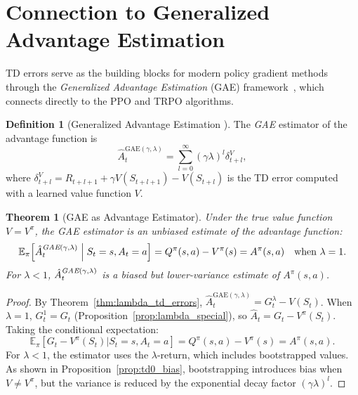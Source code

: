\documentclass[11pt,a4paper]{article}
\theoremstyle{definition}
\newtheorem{definition}{Definition}[section]
\theoremstyle{plain}
\newtheorem{theorem}{Theorem}[section]
\theoremstyle{remark}
\newcommand{\E}{\mathbb{E}}
\begin{document}
\section{Connection to Generalized Advantage Estimation}
\label{sec:gae}

TD errors serve as the building blocks for modern policy gradient methods through the \emph{Generalized Advantage Estimation} (GAE) framework~\cite{schulman2016}, which connects directly to the PPO and TRPO algorithms.

\begin{definition}[Generalized Advantage Estimation {\cite{schulman2016}}]
\label{def:gae}
The \emph{GAE} estimator of the advantage function is
\begin{equation}
    \hat{A}_t^{\text{GAE}(\gamma,\lambda)} = \sum_{l=0}^{\infty} (\gamma\lambda)^l \delta_{t+l}^V,
    \label{eq:gae}
\end{equation}
where $\delta_{t+l}^V = R_{t+l+1} + \gamma V(S_{t+l+1}) - V(S_{t+l})$ is the TD error computed with a learned value function $V$.
\end{definition}

\begin{theorem}[GAE as Advantage Estimator]
\label{thm:gae_advantage}
Under the true value function $V = V^\pi$, the GAE estimator is an unbiased estimate of the advantage function:
\begin{equation}
    \E_\pi\!\left[\hat{A}_t^{\emph{GAE}(\gamma,\lambda)} \;\middle|\; S_t = s, A_t = a\right] = Q^\pi(s,a) - V^\pi(s) = A^\pi(s,a) \quad \text{when } \lambda = 1.
\end{equation}
For $\lambda < 1$, $\hat{A}_t^{\emph{GAE}(\gamma,\lambda)}$ is a biased but lower-variance estimate of $A^\pi(s,a)$.
\end{theorem}

\begin{proof}
By Theorem~\ref{thm:lambda_td_errors}, $\hat{A}_t^{\text{GAE}(\gamma,\lambda)} = G_t^\lambda - V(S_t)$. When $\lambda = 1$, $G_t^1 = G_t$ (Proposition~\ref{prop:lambda_special}), so $\hat{A}_t = G_t - V^\pi(S_t)$. Taking the conditional expectation:
\begin{equation}
    \E_\pi[G_t - V^\pi(S_t) | S_t = s, A_t = a] = Q^\pi(s,a) - V^\pi(s) = A^\pi(s,a).
\end{equation}
For $\lambda < 1$, the estimator uses the $\lambda$-return, which includes bootstrapped values. As shown in Proposition~\ref{prop:td0_bias}, bootstrapping introduces bias when $V \neq V^\pi$, but the variance is reduced by the exponential decay factor $(\gamma\lambda)^l$.
\end{proof}
\end{document}
